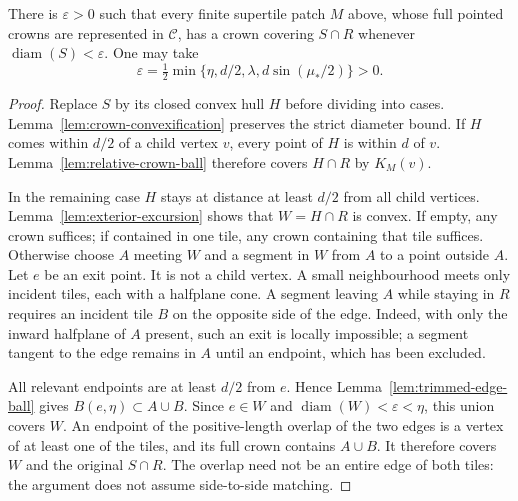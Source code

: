 \begin{lemma}
\label{lem:crown-cover-supertile}
There is $\varepsilon>0$ such that every finite supertile patch $M$ above,
whose full pointed crowns are represented in $\mathcal C$, has a crown
covering $S\cap R$ whenever $\operatorname{diam}(S)<\varepsilon$.
One may take
\[
 \varepsilon=\tfrac12\min
   \{\eta,d/2,\lambda,d\sin(\mu_*/2)\}>0.
\]
\end{lemma}
\begin{proof}
Replace $S$ by its closed convex hull $H$ before dividing into cases.
Lemma~\ref{lem:crown-convexification} preserves the strict diameter
bound.  If $H$ comes within $d/2$ of a child vertex $v$, every point of
$H$ is within $d$ of $v$.  Lemma~\ref{lem:relative-crown-ball} therefore
covers $H\cap R$ by $K_M(v)$.

In the remaining case $H$ stays at distance at least $d/2$ from all child
vertices.  Lemma~\ref{lem:exterior-excursion} shows that $W=H\cap R$ is
convex.  If empty, any crown suffices; if contained in one tile, any crown
containing that tile suffices.  Otherwise choose $A$ meeting $W$ and a
segment in $W$ from $A$ to a point outside $A$.  Let $e$ be an exit point.
It is not a child vertex.  A small neighbourhood meets only incident
tiles, each with a halfplane cone.  A segment leaving $A$ while staying
in $R$ requires an incident tile $B$ on the opposite side of the edge.
Indeed, with only the inward halfplane of $A$ present, such an exit is
locally impossible; a segment tangent to the edge remains in $A$ until
an endpoint, which has been excluded.

All relevant endpoints are at least $d/2$ from $e$.  Hence
Lemma~\ref{lem:trimmed-edge-ball} gives $B(e,\eta)\subset A\cup B$.
Since $e\in W$ and $\operatorname{diam}(W)<\varepsilon<\eta$, this union
covers $W$.  An endpoint of the positive-length overlap of the two edges
is a vertex of at least one of the tiles, and its full crown contains
$A\cup B$.  It therefore covers $W$ and the original $S\cap R$.
The overlap need not be an entire edge of both tiles: the argument does
not assume side-to-side matching.
\end{proof}

